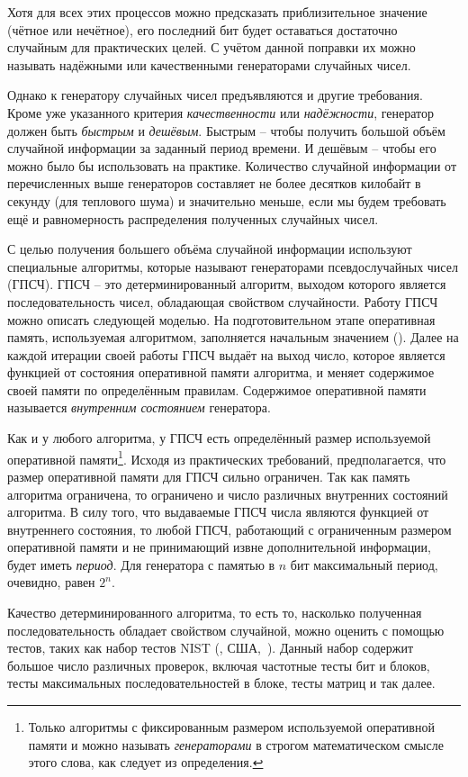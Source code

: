 Хотя для всех этих процессов можно предсказать приблизительное значение (чётное или нечётное), его последний бит будет оставаться достаточно случайным для практических целей. С учётом данной поправки их можно называть надёжными или качественными генераторами случайных чисел.

Однако к генератору случайных чисел предъявляются и другие требования. Кроме уже указанного критерия \emph{качественности} или \emph{надёжности}, генератор должен быть \emph{быстрым} и \emph{дешёвым}. Быстрым -- чтобы получить большой объём случайной информации за заданный период времени. И дешёвым -- чтобы его можно было бы использовать на практике. Количество случайной информации от перечисленных выше генераторов составляет не более десятков килобайт в секунду (для теплового шума) и значительно меньше, если мы будем требовать ещё и равномерность распределения полученных случайных чисел.

С целью получения большего объёма случайной информации используют специальные алгоритмы, которые называют генераторами псевдослучайных чисел (ГПСЧ). ГПСЧ -- это детерминированный алгоритм, выходом которого является последовательность чисел, обладающая свойством случайности. Работу ГПСЧ можно описать следующей моделью. На подготовительном этапе оперативная память, используемая алгоритмом, заполняется начальным значением (). Далее на каждой итерации своей работы ГПСЧ выдаёт на выход число, которое является функцией от состояния оперативной памяти алгоритма, и меняет содержимое своей памяти по определённым правилам. Содержимое оперативной памяти называется \emph{внутренним состоянием} генератора.

Как и у любого алгоритма, у ГПСЧ есть определённый размер используемой оперативной памяти\footnote{Только алгоритмы с фиксированным размером используемой оперативной памяти и можно называть \emph{генераторами} в строгом математическом смысле этого слова, как следует из определения.}. Исходя из практических требований, предполагается, что размер оперативной памяти для ГПСЧ сильно ограничен. Так как память алгоритма ограничена, то ограничено и число различных внутренних состояний алгоритма. В силу того, что выдаваемые ГПСЧ числа являются функцией от внутреннего состояния, то любой ГПСЧ, работающий с ограниченным размером оперативной памяти и не принимающий извне дополнительной информации, будет иметь \emph{период}. Для генератора с памятью в $n$ бит максимальный период, очевидно, равен $2^n$.

Качество детерминированного алгоритма, то есть то, насколько полученная последовательность обладает свойством случайной, можно оценить с помощью тестов, таких как набор тестов NIST (, США,~\cite{NIST:2001}). Данный набор содержит большое число различных проверок, включая частотные тесты бит и блоков, тесты максимальных последовательностей в блоке, тесты матриц и так далее.

